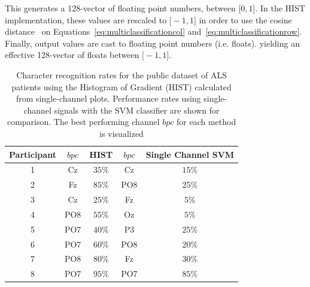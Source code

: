 \documentclass[utf8]{frontiersSCNS} %
\begin{document}
\begin{itemize}
This generates a 128-vector of floating point numbers, between $  \big[  0, 1 \big] $.  In the HIST implementation, these values are rescaled to $ \big[ -1, 1 \big] $ in order to use the cosine distance~\citep{Arandjelovic2012} on Equations~\ref{eq:multiclassificationcol} and~\ref{eq:multiclassificationrow}.  Finally, output values are cast to floating point numbers (i.e. floats). yielding an effective 128-vector of floats between $\big[ -1 , 1 \big] $.

\end{itemize}



\begin{table}[htb]
\caption{Character recognition rates for the public dataset of ALS patients using the Histogram of Gradient (HIST) calculated from  single-channel plots.  Performance rates using single-channel signals with the SVM classifier are shown for comparison.  The best performing channel $bpc$ for each method is visualized}
\centering
\begin{tabular}{c|cc|cc}
\toprule
\textbf{Participant}	&  $bpc$ 	&  HIST &  $bpc$	&  Single Channel SVM \\
\midrule
1     &     Cz   &   $35\%$    &  Cz   & $15\%$   \\
2     &     Fz   &   $85\%$      &  PO8   & $25\%$   \\
3     &     Cz   &   $25\%$    &  Fz   & $5\%$   \\
4     &     PO8 &   $55\%$   &  Oz   & $5\%$    \\
5     &     PO7 &   $40\%$    &  P3   & $25\%$   \\
6     &     PO7 &   $60\%$  &  PO8   & $20\%$    \\
7     &     PO8 &   $80\%$   &  Fz   & $30\%$     \\
8     &     PO7 &   $95\%$     &  PO7   & $85\%$ \\

\end{tabular}
\label{tab:resultsals}
\end{table}

\end{document}
